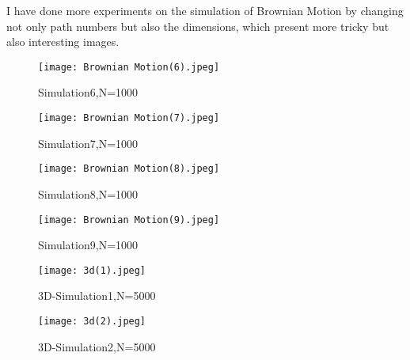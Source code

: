 \documentclass[twoside,11pt]{article}
\begin{document}
I have done more experiments on the simulation of Brownian Motion by changing not only path numbers but also the dimensions, which present more tricky but also interesting images.
\begin{figure}[ht]
    \centering
    \begin{minipage}[t]{0.45\textwidth}
    \centering
        \texttt{[image: Brownian Motion(6).jpeg]}
        \caption{Simulation6,N=1000}
    \end{minipage}
    \begin{minipage}[t]{0.46\textwidth}
    \centering
        \texttt{[image: Brownian Motion(7).jpeg]}
        \caption{Simulation7,N=1000}
    \end{minipage}
    \centering
    \begin{minipage}[t]{0.45\textwidth}
    \centering
        \texttt{[image: Brownian Motion(8).jpeg]}
        \caption{Simulation8,N=1000}
    \end{minipage}
    \begin{minipage}[t]{0.46\textwidth}
    \centering
        \texttt{[image: Brownian Motion(9).jpeg]}
        \caption{Simulation9,N=1000}
    \end{minipage}
    \begin{minipage}[t]{0.46\textwidth}
    \centering
        \texttt{[image: 3d(1).jpeg]}
        \caption{3D-Simulation1,N=5000}
    \end{minipage}
    \begin{minipage}[t]{0.46\textwidth}
    \centering
        \texttt{[image: 3d(2).jpeg]}
        \caption{3D-Simulation2,N=5000}
    \end{minipage}
\end{figure}   
\end{document}
